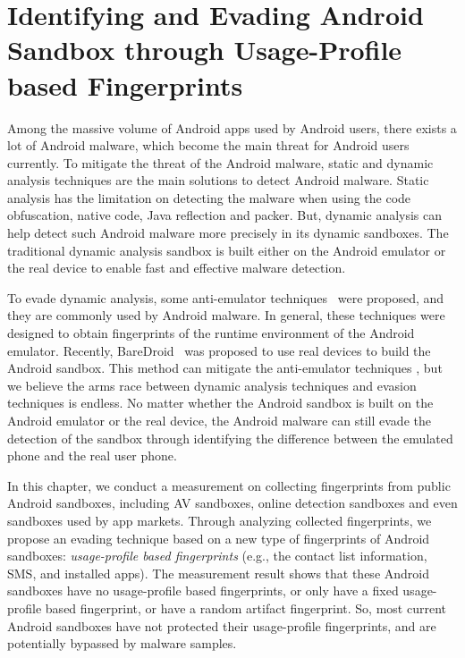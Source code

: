 \chapter{Identifying and Evading Android Sandbox through Usage-Profile based Fingerprints}


Among the massive volume of Android apps used by Android users, there exists a lot of Android malware, which become the main threat for Android users currently. To mitigate the threat of the Android malware, static and dynamic analysis techniques are the main solutions to detect Android malware. Static analysis has the limitation on detecting the malware when using the code obfuscation, native code, Java reflection and packer. But, dynamic analysis can help detect such Android malware more precisely in its dynamic sandboxes. The traditional dynamic analysis sandbox is built either on the Android emulator or the real device to enable fast and effective malware detection. 

To evade dynamic analysis, some anti-emulator techniques~\cite{Petsas,Vidas,Jing} were proposed, and they are commonly used by Android malware. In general, these techniques were designed to obtain fingerprints of the runtime environment of the Android emulator. Recently, BareDroid~\cite{Mutti:2015:BLA:2818000.2818036} was proposed to use real devices to build the Android sandbox. This method can mitigate the anti-emulator techniques
, but we believe the arms race between dynamic analysis techniques and evasion techniques is endless. No matter whether the Android sandbox is built on the Android emulator or the real device, the Android malware can still evade the detection of the sandbox through identifying the difference between the emulated phone and the real user phone. 

In this chapter, we conduct a measurement on collecting fingerprints from public Android sandboxes, including AV sandboxes, online detection sandboxes and even sandboxes used by app markets. Through analyzing collected fingerprints, we propose an evading technique based on a new type of fingerprints of Android sandboxes: \textit{usage-profile based fingerprints} (e.g., the contact list information, SMS, and installed apps). The measurement result shows that these Android sandboxes have no usage-profile based fingerprints, or only have a fixed usage-profile based fingerprint, or have a random artifact fingerprint. So, most current Android sandboxes have not protected their usage-profile fingerprints, and are potentially bypassed by malware samples.

